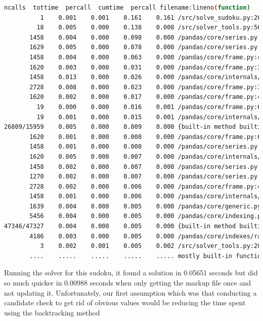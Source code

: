 \documentclass[12pt]{report} %
\begin{document}
\begin{lstlisting}[language=Bash, basicstyle=\tiny]
          ncalls  tottime  percall  cumtime  percall filename:lineno(function)
          1    0.001    0.001    0.161    0.161 /src/solve_sudoku.py:26(solve_sudoku)
         18    0.005    0.000    0.138    0.008 /src/solver_tools.py:56(markup)
       1458    0.004    0.000    0.098    0.000 /pandas/core/series.py:1180(__setitem__)
       1629    0.005    0.000    0.078    0.000 /pandas/core/series.py:1396(_maybe_update_cacher)
       1458    0.004    0.000    0.063    0.000 /pandas/core/frame.py:4430(_maybe_cache_changed)
       1620    0.003    0.000    0.031    0.000 /pandas/core/frame.py:3779(_ixs)
       1458    0.013    0.000    0.026    0.000 /pandas/core/internals/managers.py:1045(iset)
       2728    0.008    0.000    0.023    0.000 /pandas/core/frame.py:3856(__getitem__)
       1620    0.002    0.000    0.017    0.000 /pandas/core/frame.py:4387(_box_col_values)
         19    0.000    0.000    0.016    0.001 /pandas/core/frame.py:668(__init__)
         19    0.001    0.000    0.015    0.001 /pandas/core/internals/construction.py:423(dict_to_mgr)
26809/15959    0.005    0.000    0.009    0.000 {built-in method builtins.len}
       1620    0.001    0.000    0.008    0.000 /pandas/core/frame.py:656(_constructor_sliced_from_mgr)
       1458    0.001    0.000    0.008    0.000 /pandas/core/series.py:1270(_set_with_engine)
       1620    0.005    0.000    0.007    0.000 /pandas/core/internals/managers.py:991(iget)
       1458    0.002    0.000    0.007    0.000 /pandas/core/series.py:1385(_check_is_chained_assignment_possible)
       1270    0.002    0.000    0.007    0.000 /pandas/core/series.py:1016(__getitem__)
       2728    0.002    0.000    0.006    0.000 /pandas/core/frame.py:4405(_get_item_cache)  
       1458    0.001    0.000    0.006    0.000 /pandas/core/internals/managers.py:1977(setitem_inplace)
       1639    0.004    0.000    0.005    0.000 /pandas/core/generic.py:6147(__finalize__)
       5456    0.004    0.000    0.005    0.000 /pandas/core/indexing.py:2678(check_dict_or_set_indexers)
47346/47327    0.004    0.000    0.005    0.000 {built-in method builtins.isinstance}
       4186    0.003    0.000    0.005    0.000 /pandas/core/indexes/range.py:394(__contains__)
          3    0.002    0.001    0.005    0.002 /src/solver_tools.py:20(check_sudoku)
       ....    .....    .....    .....    ..... mostly built-in functions of packages
\end{lstlisting}

Running the solver for this sudoku, it found a solution in 0.05651 seconds but did so much quicker in 0.00988 seconds when only getting the markup file once and not updating it. Unfortunately, our first assumption which was that conducting a candidate check to get rid of obvious values would be reducing the time spent using the backtracking method
\end{document}

